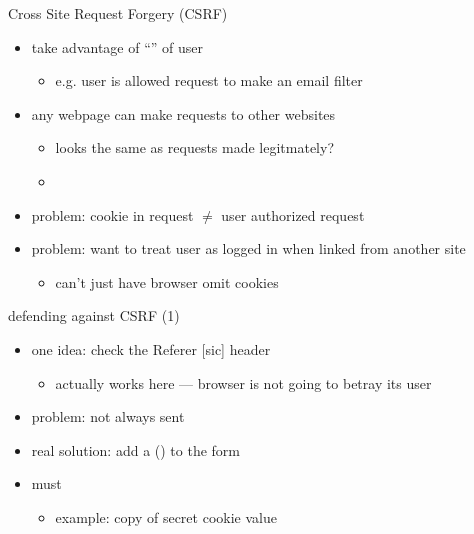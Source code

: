 \begin{frame}{Cross Site Request Forgery (CSRF)}
    \begin{itemize}
        \item take advantage of ``'' of user
            \begin{itemize}
                \item e.g. user is allowed request to make an email filter
            \end{itemize}
        \item any webpage can make requests to other websites
            \begin{itemize}
                \item looks the same as requests made legitmately?
                \item {}
            \end{itemize}
        \item problem: cookie in request $\not=$ user authorized request
        \item problem: want to treat user as logged in when linked from another site
            \begin{itemize}
            \item can't just have browser omit cookies
            \end{itemize}
    \end{itemize}
\end{frame}


\begin{frame}{defending against CSRF (1)}
    \begin{itemize}
        \item one idea: check the Referer [sic] header
            \begin{itemize}
            \item actually works here --- browser is not going to betray its user
            \end{itemize}
        \item problem: not always sent
        \vspace{.5cm}
        \item<2> real solution: add a  () to the form
        \item<2> must 
            \begin{itemize}
            \item example: copy of secret cookie value
            \end{itemize}
    \end{itemize}
\end{frame}

